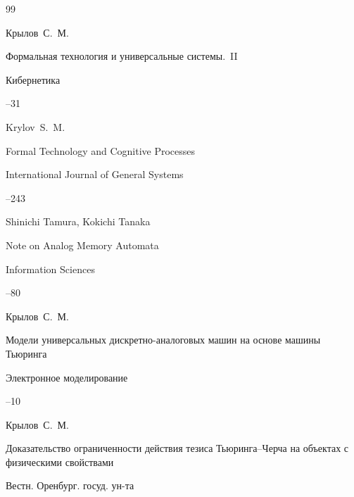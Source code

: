 \begin{thebibliography}{99}

\by Крылов~С.~М.

\paper Формальная технология и универсальные системы.~II

\jour Кибернетика



--31




\by Krylov~S.~M.

\paper Formal Technology and Cognitive Processes

\jour 

    International Journal of General Systems




--243





\by Shinichi Tamura, Kokichi Tanaka

\paper Note on Analog Memory Automata

\jour Information Sciences



--80





\by Крылов~С.~М.

\paper Модели универсальных дискретно-аналоговых машин на основе машины Тьюринга

\jour Электронное моделирование



--10






\by Крылов~С.~М.

\paper Доказательство ограниченности действия тезиса Тьюринга--Черча на объектах с физическими свойствами

\jour Вестн. Оренбург. госуд. ун-та


\end{thebibliography}
